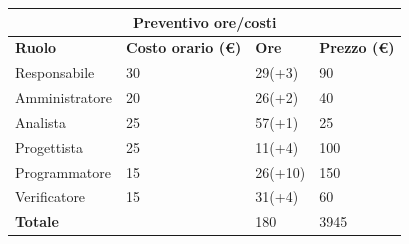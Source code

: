 \documentclass[a4paper, 12pt]{article}
\begin{document}
\begin{center}
	\begin{tabularx}{\textwidth}{|X|X|X|X|}
		\hline
		\multicolumn{4}{|c|}{\textbf{Preventivo ore/costi}}                                      \\
		\hline
		\hline
		\textbf{Ruolo}  & \textbf{Costo orario (\euro)} & \textbf{Ore} & \textbf{Prezzo (\euro)} \\
		\hline
		Responsabile    & 30                            & 29(+3)       & 90                      \\
		\hline
		Amministratore  & 20                            & 26(+2)       & 40                      \\
		\hline
		Analista        & 25                            & 57(+1)       & 25                      \\
		\hline
		Progettista     & 25                            & 11(+4)       & 100                     \\
		\hline
		Programmatore   & 15                            & 26(+10)      & 150                     \\
		\hline
		Verificatore    & 15                            & 31(+4)       & 60                      \\
		\hline
		\hline
		\textbf{Totale} &                               & 180          & 3945                    \\
		\hline
	\end{tabularx}\\[8pt]
	\mbox{}\\
\end{center}
\end{document}
